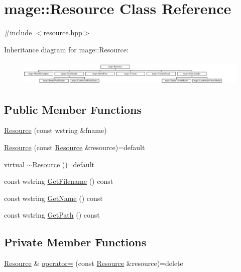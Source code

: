 \hypertarget{classmage_1_1_resource}{}\section{mage\+:\+:Resource Class Reference}
\label{classmage_1_1_resource}


{\ttfamily \#include $<$resource.\+hpp$>$}

Inheritance diagram for mage\+:\+:Resource\+:\begin{figure}[H]
\begin{center}
\leavevmode
\includegraphics[height=1.224490cm]{classmage_1_1_resource}
\end{center}
\end{figure}
\subsection*{Public Member Functions}
\begin{DoxyCompactItemize}
\item 
\hyperlink{classmage_1_1_resource_a3a1972d0ea30505d3a27e566aeb74834}{Resource} (const wstring \&fname)
\item 
\hyperlink{classmage_1_1_resource_ab847b406a175fb1fb43713f58854bf81}{Resource} (const \hyperlink{classmage_1_1_resource}{Resource} \&resource)=default
\item 
virtual \hyperlink{classmage_1_1_resource_a26cea6261aac321d95ac745703f1a3e8}{$\sim$\+Resource} ()=default
\item 
const wstring \hyperlink{classmage_1_1_resource_a1f05385b8c05646989689fc04847a816}{Get\+Filename} () const
\item 
const wstring \hyperlink{classmage_1_1_resource_a6c253886da9b0c3a52ca7a38ba448d74}{Get\+Name} () const
\item 
const wstring \hyperlink{classmage_1_1_resource_a82a540b610f04adc251771ec6fe8e535}{Get\+Path} () const
\end{DoxyCompactItemize}
\subsection*{Private Member Functions}
\begin{DoxyCompactItemize}
\item 
\hyperlink{classmage_1_1_resource}{Resource} \& \hyperlink{classmage_1_1_resource_ad8fa57f37eb253b90d18d33383b12875}{operator=} (const \hyperlink{classmage_1_1_resource}{Resource} \&resource)=delete
\end{DoxyCompactItemize}
